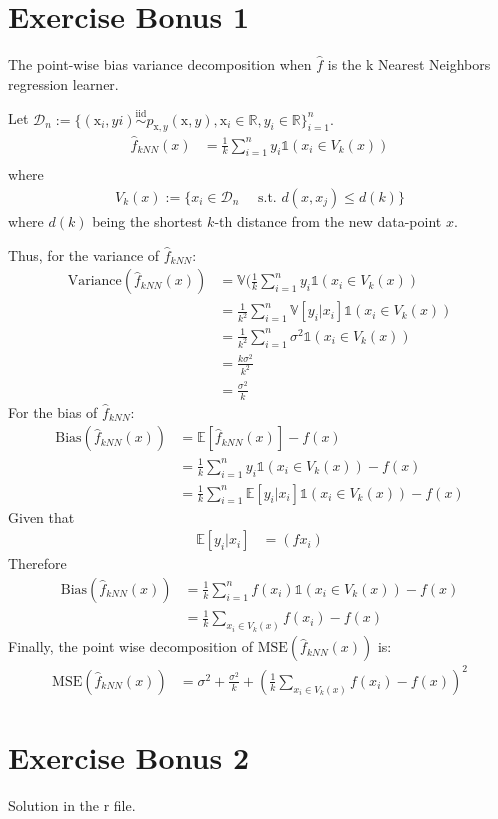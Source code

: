 \documentclass[12pt,a4paper]{article}
\begin{document}
\section*{Exercise Bonus 1}
The point-wise bias variance decomposition
when $\hat{f}$ is the k Nearest Neighbors regression learner.

Let  $\mathscr{D}_n :=\lbrace{(\mathrm{x}_i,yi) \overset{\text{iid}}{\sim} p_{\mathrm{x},y}(\mathrm{x},y) ,  \mathrm{x}_i \in \mathbb{R}, y_i \in \mathbb{R}\rbrace_{ i= 1}^n}.$ 
\begin{align*}
\widehat{f}_{kNN}(x)  &= \frac{1}{k} \sum_{i=1}^{n} y_i \mathbb{1}(x_i \in V_k(x))\\
\end{align*}
where 
\begin{align*}
   V_k(x) := \{  x_i \in \mathscr{D}_n   \quad  \text{ s.t.   }  d(x,x_j) \leq d(k) \}
\end{align*}
where $d(k)$ being the shortest $k$-th distance from the new data-point  $x$.

Thus, for the variance of $ \widehat{f}_{kNN}$:
\begin{align*}
  \text{Variance} \left(  \widehat{f}_{kNN}(x)\right) &=  \mathbb{V}(\frac{1}{k}  \sum_{i=1}^n y_i \mathbb{1}(x_i \in V_k(x))\\
  &=  \frac{1}{k^2}  \sum_{i=1}^n \mathbb{V}[y_i | x_i] \mathbb{1}(x_i \in V_k(x))\\
  &= \frac{1}{k^2}  \sum_{i=1}^n \sigma^2 \mathbb{1}(x_i \in V_k(x))\\
  &= \frac{k\sigma^2}{k^2} \\
  &= \frac{\sigma^2}{k}
\end{align*}
For the bias of $ \widehat{f}_{kNN}$:
\begin{align*}
  \text{Bias} \left(  \widehat{f}_{kNN}(x)\right) &=  \mathbb{E}[ \widehat{f}_{kNN}(x)]  - f(x)\\
  &=  \frac{1}{k}  \sum_{i=1}^n y_i \mathbb{1}(x_i \in V_k(x)) -  f(x)\\
  &= \frac{1}{k}  \sum_{i=1}^n \mathbb{E}[y_i | x_i] \mathbb{1}(x_i \in V_k(x)) -  f(x)
\end{align*}
Given that 
\begin{align*}
		 \mathbb{E}[y_i | x_i]  &= (fx_i)
\end{align*}
Therefore 
\begin{align*}
	  \text{Bias} \left(  \widehat{f}_{kNN}(x)\right) &=   \frac{1}{k}  \sum_{i=1}^n f(x_i)  \mathbb{1}(x_i \in V_k(x)) -  f(x)\\
	  &=   \frac{1}{k}  \sum_{x_i \in V_k(x)} f(x_i) - f(x)
\end{align*}
Finally, the point wise decomposition of $\text{MSE}\left(  \widehat{f}_{kNN}(x)\right) $ is:
\begin{align*}
	\text{MSE}\left(  \widehat{f}_{kNN}(x)\right) &= \sigma^2 + \frac{\sigma^2}{ k} + \left(     \frac{1}{k}  \sum_{x_i \in V_k(x)} f(x_i) - f(x)   \right)^2
\end{align*}
\section*{Exercise Bonus 2}
Solution in the r file.
\end{document}
